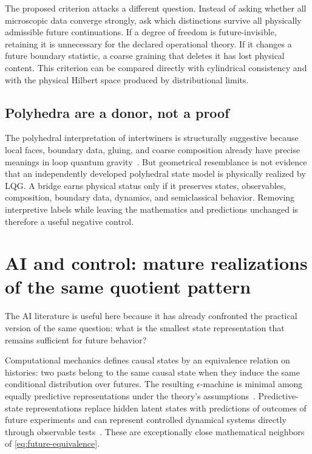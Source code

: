 \documentclass[11pt]{article}
\begin{document}
The proposed criterion attacks a different question. Instead of asking whether all microscopic data converge strongly, ask which distinctions survive all physically admissible future continuations. If a degree of freedom is future-invisible, retaining it is unnecessary for the declared operational theory. If it changes a future boundary statistic, a coarse graining that deletes it has lost physical content. This criterion can be compared directly with cylindrical consistency and with the physical Hilbert space produced by distributional limits.

\subsection{Polyhedra are a donor, not a proof}

The polyhedral interpretation of intertwiners is structurally suggestive because local faces, boundary data, gluing, and coarse composition already have precise meanings in loop quantum gravity~\cite{bianchi2011,baytas2018}. But geometrical resemblance is not evidence that an independently developed polyhedral state model is physically realized by LQG. A bridge earns physical status only if it preserves states, observables, composition, boundary data, dynamics, and semiclassical behavior. Removing interpretive labels while leaving the mathematics and predictions unchanged is therefore a useful negative control.

\section{AI and control: mature realizations of the same quotient pattern}
\label{sec:ai}

The AI literature is useful here because it has already confronted the practical version of the same question: what is the smallest state representation that remains sufficient for future behavior?

Computational mechanics defines causal states by an equivalence relation on histories: two pasts belong to the same causal state when they induce the same conditional distribution over futures. The resulting $\epsilon$-machine is minimal among equally predictive representations under the theory's assumptions~\cite{crutchfield1989,shalizi2001}. Predictive-state representations replace hidden latent states with predictions of outcomes of future experiments and can represent controlled dynamical systems directly through observable tests~\cite{littman2001,singh2004}. These are exceptionally close mathematical neighbors of \eqref{eq:future-equivalence}.
\end{document}
